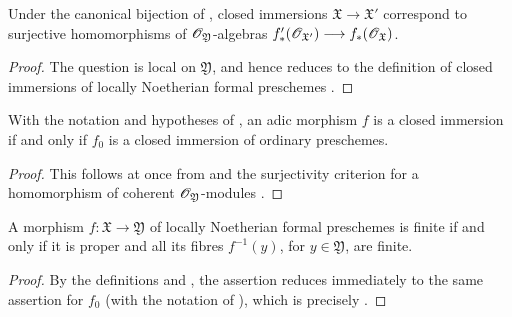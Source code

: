 \begin{corollary}[4.8.9]
\label{III.4.8.9}
Under the canonical bijection of , closed
immersions $\mathfrak{X}\to\mathfrak{X}'$ correspond to
surjective homomorphisms of $\mathscr{O}_{\mathfrak{Y}}$-algebras $f'_*(\mathscr{O}_{\mathfrak{X}'})
\longrightarrow
f_*(\mathscr{O}_{\mathfrak{X}})$.
\end{corollary}

\begin{proof}
The question is local on $\mathfrak{Y}$, and hence reduces to the
definition of closed immersions of locally Noetherian formal
preschemes .
\end{proof}

\begin{corollary}[4.8.10]
\label{III.4.8.10}
With the notation and hypotheses of , an adic
morphism $f$ is a closed immersion if and only if $f_0$ is a
closed immersion of ordinary preschemes.
\end{corollary}

\begin{proof}
This follows at once from  and the surjectivity
criterion for a homomorphism of coherent
$\mathscr{O}_{\mathfrak{Y}}$-modules .
\end{proof}

\begin{proposition}[4.8.11]
\label{III.4.8.11}
A morphism $f:\mathfrak{X}\to\mathfrak{Y}$ of locally Noetherian
formal preschemes
is finite if and only if it is proper and all its fibres
$f^{-1}(y)$, for $y\in\mathfrak{Y}$, are finite.
\end{proposition}

\begin{proof}
By the definitions  and , the
assertion reduces immediately to the same assertion for $f_0$
(with the notation of ), which is precisely
.
\end{proof}
